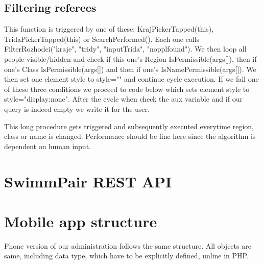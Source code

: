 \subsection{Filtering referees}
This function is triggered by one of these: KrajPickerTapped(this), TridaPickerTapped(this) or SearchPerformed(). Each one calls FilterRozhodci("kraje", "tridy", "inputTrida", "nopplfound"). We then loop all people visible/hidden and check if this one's Region IsPermissible(args[]), then if one's Class IsPermissible(args[]) and then if one's IsNamePermissible(args[]). We then set one element style to style="" and continue cycle execution. If we fail one of these three conditions we proceed to code below which sets element style to style="display:none". After the cycle when check the aux variable and if our query is indeed empty we write it for the user.
\par
This long procedure gets triggered and subsequently executed everytime region, class or name is changed. Performance should be fine here since the algorithm is dependent on human input. 

\section{SwimmPair REST API}

\section{Mobile app structure}
Phone version of our administration follows the same structure. All objects are same, including data type, which have to be explicitly defined, unline in PHP.
